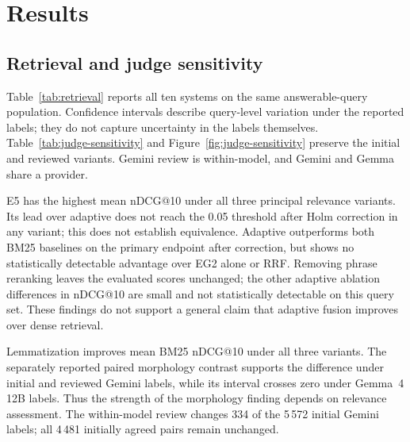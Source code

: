 \section{Results}\label{sec:results}


\subsection{Retrieval and judge sensitivity}
Table~\ref{tab:retrieval} reports all ten systems on the same answerable-query population. Confidence intervals describe query-level variation under the reported labels; they do not capture uncertainty in the labels themselves. Table~\ref{tab:judge-sensitivity} and Figure~\ref{fig:judge-sensitivity} preserve the initial and reviewed variants. Gemini review is within-model, and Gemini and Gemma share a provider.

E5 has the highest mean nDCG@10 under all three principal relevance variants. Its lead over adaptive does not reach the 0.05 threshold after Holm correction in any variant; this does not establish equivalence. Adaptive outperforms both BM25 baselines on the primary endpoint after correction, but shows no statistically detectable advantage over EG2 alone or RRF. Removing phrase reranking leaves the evaluated scores unchanged; the other adaptive ablation differences in nDCG@10 are small and not statistically detectable on this query set. These findings do not support a general claim that adaptive fusion improves over dense retrieval.

Lemmatization improves mean BM25 nDCG@10 under all three variants. The separately reported paired morphology contrast supports the difference under initial and reviewed Gemini labels, while its interval crosses zero under Gemma~4 12B labels. Thus the strength of the morphology finding depends on relevance assessment. The within-model review changes 334 of the 5\,572 initial Gemini labels; all 4\,481 initially agreed pairs remain unchanged.

\begin{table}[p]
\centering
\caption{Document retrieval on 170 answerable queries. Means and 95\% query-bootstrap intervals use Gemini labels after the within-model disagreement review. The two panels preserve all five metrics. A dagger marks a paired difference from adaptive at Holm-adjusted $p<0.05$, not necessarily an improvement. R@100 is pool-relative. E5 uses a smaller text-only candidate universe.}
\label{tab:retrieval}

\end{table}

